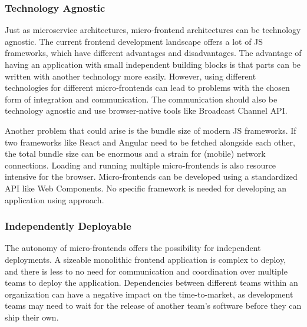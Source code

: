 \subsubsection{Technology Agnostic}\label{subsubsection:background:micro-frontend-technology-agnostic}

Just as microservice architectures, micro-frontend architectures can be technology agnostic. The current frontend development landscape offers a lot of \ac{JS} frameworks, which have different advantages and disadvantages. The advantage of having an application with small independent building blocks is that parts can be written with another technology more easily. \cite[14-16]{book:2020:geers:background:micro-frontends:micro-frontends-in-action} However, using different technologies for different micro-frontends can lead to problems with the chosen form of integration and communication. The communication should also be technology agnostic and use browser-native tools like Broadcast Channel \ac{API}.

\bigskip

\noindent Another problem that could arise is the bundle size of modern \ac{JS} frameworks. If two frameworks like React and Angular need to be fetched alongside each other, the total bundle size can be enormous and a strain for (mobile) network connections. Loading and running multiple micro-frontends is also resource intensive for the browser. Micro-frontends can be developed using a standardized \ac{API} like Web Components. No specific framework is needed for developing an application using approach. \cite{book:2020:geers:background:micro-frontends:micro-frontends-in-action}

\subsubsection{Independently Deployable}\label{subsubsection:background:micro-frontend-independent-deployable}

The autonomy of micro-frontends offers the possibility for independent deployments. A sizeable monolithic frontend application is complex to deploy, and there is less to no need for communication and coordination over multiple teams to deploy the application. Dependencies between different teams within an organization can have a negative impact on the time-to-market, as development teams may need to wait for the release of another team's software before they can ship their own. \cite[12]{book:2020:geers:background:micro-frontends:micro-frontends-in-action}

